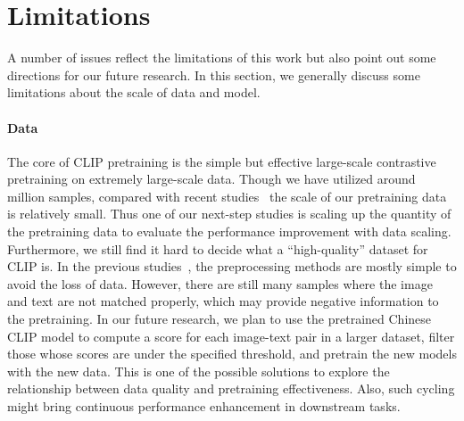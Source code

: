\documentclass[11pt]{article}
\begin{document}
%
 












































\section*{Limitations}
A number of issues reflect the limitations of this work but also point out some directions for our future research. In this section, we generally discuss some limitations about the scale of data and model. 

\paragraph{Data} 
The core of CLIP pretraining is the simple but effective large-scale contrastive pretraining on extremely large-scale data. Though we have utilized around  million samples, compared with recent studies~\citep{florence, pali} the scale of our pretraining data is relatively small. 
Thus one of our next-step studies is scaling up the quantity of the pretraining data to evaluate the performance improvement with data scaling. 
Furthermore, we still find it hard to decide what a ``high-quality'' dataset for CLIP is. 
In the previous studies~\citep{align, declip}, the preprocessing methods are mostly simple to avoid the loss of data. 
However, there are still many samples where the image and text are not matched properly, which may provide negative information to the pretraining. 
In our future research, we plan to use the pretrained Chinese CLIP model to compute a score for each image-text pair in a larger dataset, filter those whose scores are under the specified threshold, and pretrain the new models with the new data. 
This is one of the possible solutions to explore the relationship between data quality and pretraining effectiveness. 
Also, such cycling might bring continuous performance enhancement in downstream tasks. 
\end{document}
